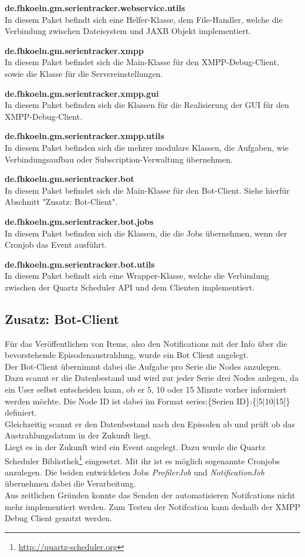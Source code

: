 \textbf{de.fhkoeln.gm.serientracker.webservice.utils}\\
In diesem Paket befindt sich eine Helfer-Klasse, dem File-Handler, welche die Verbindung zwischen Dateisystem und JAXB Objekt implementiert.

\textbf{de.fhkoeln.gm.serientracker.xmpp}\\
In diesem Paket befindet sich die Main-Klasse für den XMPP-Debug-Client, sowie die Klasse für die Servereinstellungen.

\textbf{de.fhkoeln.gm.serientracker.xmpp.gui}\\
In diesem Paket befinden sich die Klassen für die Realisierung der GUI für den XMPP-Debug-Client.

\textbf{de.fhkoeln.gm.serientracker.xmpp.utils}\\
In diesem Paket befinden sich die mehrer modulare Klassen, die Aufgaben, wie Verbindungsaufbau oder Subscription-Verwaltung übernehmen.

\textbf{de.fhkoeln.gm.serientracker.bot}\\
In diesem Paket befindet sich die Main-Klasse für den Bot-Client. Siehe hierfür Abschnitt "Zusatz: Bot-Client".

\textbf{de.fhkoeln.gm.serientracker.bot.jobs}\\
In diesem Paket befinden sich die Klassen, die die Jobs übernehmen, wenn der Cronjob das Event ausführt.

\textbf{de.fhkoeln.gm.serientracker.bot.utils}\\
In diesem Paket befindt sich eine Wrapper-Klasse, welche die Verbindung zwischen der Quartz Scheduler API und dem Clienten implementiert.

\newpage

\subsection{Zusatz: Bot-Client}

Für das Veröffentlichen von Items, also den Notifications mit der Info über die bevorstehende Episodenaustrahlung, wurde ein Bot Client angelegt.\\
Der Bot-Client übernimmt dabei die Aufgabe pro Serie die Nodes anzulegen. Dazu scannt er die Datenbestand und wird zur jeder Serie drei Nodes anlegen, da ein User selbst entscheiden kann, ob er 5, 10 oder 15 Minute vorher informiert werden möchte. Die Node ID ist dabei im Format \textsf{series:\{Serien ID\}:\{[5|10|15]\}} definiert.\\
Gleichzeitig scannt er den Datenbestand nach den Episoden ab und prüft ob das Austrahlungsdatum in der Zukunft liegt.\\
Liegt es in der Zukunft wird ein Event angelegt. Dazu wurde die Quartz Scheduler Bibliothek\footnote{\url{http://quartz-scheduler.org}} eingesetzt. Mit ihr ist es möglich sogenannte Cronjobs anzulegen. Die beiden entwickleten Jobs \textit{ProfilerJob} und \textit{NotificationJob} übernehmen dabei die Verarbeitung.\\

Aus zeitlichen Gründen konnte  das Senden der automatisieren Notifcations nicht mehr implementiert werden. Zum Testen der Notifcation kann deshalb der XMPP Debug Client genutzt werden.
